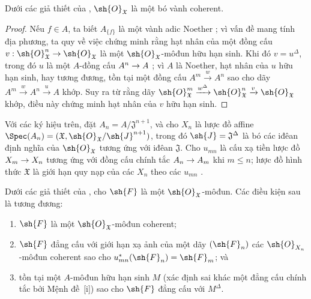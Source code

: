 \documentclass[oneside]{amsart}
\makeatletter
\renewcommand{\leq}{\leqslant}
\newcommand{\ega@arrow}[2]{\mathchoice{#1}{#2}{#2}{#2}}
\renewcommand{\to}{\ega@arrow{\longrightarrow}{\rightarrow}}
\let\EGAOriginalLabel\label
\renewcommand{\label}[1]{\phantomsection\EGAOriginalLabel{#1}}
\makeatother
\begin{document}
\begin{proposition}[10.10.3]
\label{I.10.10.3}
Dưới các giả thiết của , $\sh{O}_\mathfrak{X}$ là một bó vành coherent.
\end{proposition}

\begin{proof}
Nếu $f\in A$, ta biết $A_{\{f\}}$ là một vành adic Noether ; vì vấn đề mang tính địa phương, ta quy về  việc chứng minh rằng hạt nhân của một đồng cấu $v:\sh{O}_\mathfrak{X}^n\to\sh{O}_\mathfrak{X}$ là một $\sh{O}_\mathfrak{X}$-môđun hữu hạn sinh.
Khi đó $v=u^\Delta$, trong đó $u$ là một $A$-đồng cấu $A^n\to A$ ; vì $A$ là Noether, hạt nhân của $u$ hữu hạn sinh, hay tương đương, tồn tại một đồng cấu $A^m\xrightarrow{w}A^n$ sao cho dãy $A^m\xrightarrow{w}A^n\xrightarrow{u}A$ khớp.
Suy ra từ  rằng dãy $\sh{O}_\mathfrak{X}^m\xrightarrow{w^\Delta}\sh{O}_\mathfrak{X}^n\xrightarrow{v}\sh{O}_\mathfrak{X}$ khớp, điều này chứng minh hạt nhân của $v$ hữu hạn sinh.
\end{proof}

\begin{env}[10.10.4]
\label{I.10.10.4}
Với các ký hiệu trên, đặt $A_n=A/\mathfrak{J}^{n+1}$, và cho $X_n$ là lược đồ affine $\Spec(A_n)=(\mathfrak{X},\sh{O}_\mathfrak{X}/\sh{J}^{n+1})$, trong đó $\sh{J}=\mathfrak{J}^\Delta$ là bó các iđêan định nghĩa của $\sh{O}_\mathfrak{X}$ tương ứng với iđêan $\mathfrak{J}$.
Cho $u_{mn}$ là cấu xạ tiền lược đồ $X_m\to X_n$ tương ứng với đồng cấu chính tắc $A_n\to A_m$ khi $m\leq n$; lược đồ hình thức $\mathfrak{X}$ là giới hạn quy nạp của các $X_n$ theo các $u_{mn}$ .
\end{env}

\begin{proposition}[10.10.5]
\label{I.10.10.5}
Dưới các giả thiết của , cho $\sh{F}$ là một $\sh{O}_\mathfrak{X}$-môđun.
Các điều kiện sau là tương đương:
\begin{enumerate}
  \item[\rm{(a)}] $\sh{F}$ là một $\sh{O}_\mathfrak{X}$-môđun coherent;
  \item[\rm{(b)}] $\sh{F}$ đẳng cấu với giới hạn xạ ảnh  của một dãy $(\sh{F}_n)$ các $\sh{O}_{X_n}$-môđun coherent sao cho $u_{mn}^*(\sh{F}_n)=\sh{F}_m$; và
  \item[\rm{(c)}] tồn tại một $A$-môđun hữu hạn sinh $M$ (xác định sai khác một đẳng cấu chính tắc bởi Mệnh đề~[i]) sao cho $\sh{F}$ đẳng cấu với $M^\Delta$.
\end{enumerate}
\end{proposition}
\end{document}

